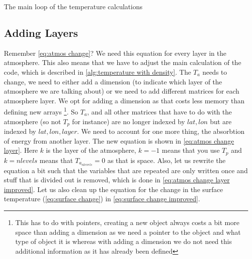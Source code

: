 \begin{algorithm}[hbt]
    \SetAlgoLined
    \caption{The main loop of the temperature calculations}
    \label{alg:temperature with density}
\end{algorithm}

\subsection{Adding Layers}
Remember \autoref{eq:atmos change}? We need this equation for every layer in the atmosphere. This also means that we have to adjust the main calculation of the code, which is described  in 
\autoref{alg:temperature with density}. The $T_a$ needs to change, we need to either add a dimension (to indicate which layer of the atmosphere we are talking about) or we need to add different
matrices for each atmosphere layer. We opt for adding a dimension as that costs less memory than defining new arrays 
\footnote{This has to do with pointers, creating a new object always costs a bit more space than adding a dimension as we need a pointer to the object and what type of object it is whereas with 
adding a dimension we do not need this additional information as it has already been defined}. So $T_a$, and all other matrices that have to do with the atmosphere (so not $T_p$ for instance) 
are no longer indexed by $lat, lon$ but are indexed by $lat, lon, layer$. We need to account for one more thing, the absorbtion of energy from another layer. The new equation is shown in 
\autoref{eq:atmos change layer}. Here $k$ is the layer of the atmosphere, $k = -1$ means that you use $T_p$ and $k = nlevels$ means that $T_{a_{nlevels}} = 0$ as that is space. Also, let us
rewrite the equation a bit such that the variables that are repeated are only written once and stuff that is divided out is removed, which is done in \autoref{eq:atmos change layer improved}.
Let us also clean up the equation for the change in the surface temperature (\autoref{eq:surface change}) in \autoref{eq:surface change improved}.

